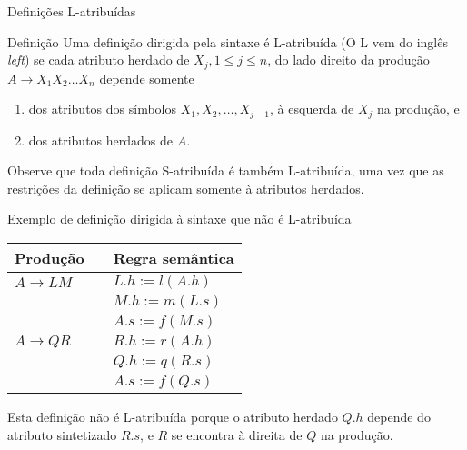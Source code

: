 \begin{frame}[fragile]{Definições L-atribuídas}

    \begin{block}{Definição}
        Uma definição dirigida pela sintaxe é L-atribuída (O L vem do inglês \textit{left}) se cada atributo herdado de $X_j, 1\leq j\leq n$, do lado direito da
        produção $A\to X_1X_2\ldots X_n$ depende somente
        \begin{enumerate}
            \item dos atributos dos símbolos $X_1, X_2, \ldots, X_{j - 1}$, à esquerda de $X_j$ na produção, e
            \item dos atributos herdados de $A$.
        \end{enumerate}
    \end{block}

    \pause
    \vspace{0.2in}

    Observe que toda definição S-atribuída é também L-atribuída, uma vez que as restrições da definição se aplicam somente à atributos herdados.

\end{frame}

\begin{frame}[fragile]{Exemplo de definição dirigida à sintaxe que não é L-atribuída}

    \begin{table}[h]
        \begin{tabular}{lp{2cm}l}
            \toprule
            \textbf{Produção} & & \textbf{Regra semântica} \\
            \midrule
            $A\to LM$ & & $L.h := l(A.h)$ \\
            & & $M.h := m(L.s) $ \\
            & & $A.s := f(M.s) $ \\
            \midrule
            $A\to QR$ & & $R.h := r(A.h)$ \\
            & & $Q.h := q(R.s)$ \\
            & & $A.s := f(Q.s)$ \\
            \bottomrule
        \end{tabular}
    \end{table}

    \pause
    \vspace{0.2in}

    Esta definição não é L-atribuída porque o atributo herdado $Q.h$ depende do atributo sintetizado $R.s$, e $R$ se encontra à direita de $Q$ na produção.
\end{frame}

